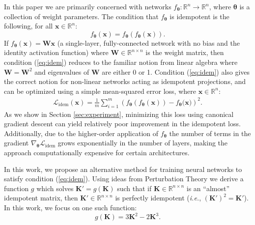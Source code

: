 \documentclass{article}
\theoremstyle{plain}
\theoremstyle{definition}
\theoremstyle{remark}
\newcommand{\vx}{\mathbf{x}}
\newcommand{\vK}{\mathbf{K}}
\newcommand{\vW}{\mathbf{W}}
\newcommand{\vtheta}{\bm{\theta}}
\begin{document}
In this paper we are primarily concerned with networks ${f_{\vtheta}: \mathbb{R}^n \to \mathbb{R}^n}$, where $\vtheta$ is a collection of weight parameters. The condition that $f_{\vtheta}$ is idempotent is the following, for all ${\vx \in \mathbb{R}^n}$:
%
\begin{equation}
    f_{\vtheta}(\vx) = f_{\vtheta}(f_{\vtheta}(\vx)).
    \label{eq:idem}
\end{equation}
%
If ${f_{\vtheta}(\vx) = \vW \vx}$ (a single-layer, fully-connected network with no bias and the identity activation function) where ${\vW \in \mathbb{R}^{n \times n}}$ is the weight matrix, then condition (\ref{eq:idem}) reduces to the familiar notion from linear algebra where $\vW = \vW^2$ and eigenvalues of $\vW$ are either 0 or 1. Condition (\ref{eq:idem}) also gives the correct notion for non-linear networks acting as idempotent projections, and can be optimized using a simple mean-squared error loss, where ${\vx \in \mathbb{R}^{n}}$:
%
\begin{align}
    \mathcal{L}_\text{idem}(\vx) = \frac{1}{m} \sum_{i = 1}^m \left(f_{\vtheta}(f_{\vtheta}(\vx)) - f_{\vtheta}\big(\vx \big)\right)^2.
    \label{eq:idem-loss}
\end{align}
%
As we show in Section \ref{sec:experiment}, minimizing this loss using canonical gradient descent can yield relatively poor improvement in the idempotent loss. Additionally, due to the higher-order application of $f_{\vtheta}$ the number of terms in the gradient ${\nabla_{\vtheta} \mathcal{L}_{\text{idem}}}$ grows exponentially in the number of layers, making the approach computationally expensive for certain architectures.

In this work, we propose an alternative method for training neural networks to satisfy condition (\ref{eq:idem}). Using ideas from Perturbation Theory \cite{intro-pertub-theory} we derive a function $g$ which solves ${\vK' = g(\vK)}$ such that if ${\vK \in \mathbb{R}^{n \times n}}$ is an ``almost'' idempotent matrix, then ${\vK' \in \mathbb{R}^{n \times n}}$ is perfectly idempotent (\textit{i.e.}, ${(\vK')^2 = \vK'}$). In this work, we focus on one such function:
%
\begin{equation}
    g(\vK) = 3 \vK^2 - 2 \vK^3.
    \label{eq:g}
\end{equation}
\end{document}
